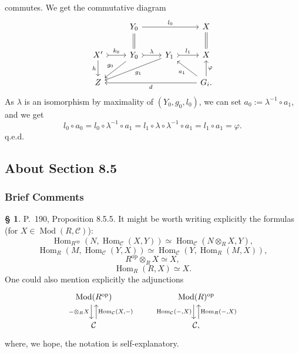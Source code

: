 \documentclass[12pt]{article}
\theoremstyle{remark}
\theoremstyle{definition}
\newtheorem{s}[thm]{\S}
\newcommand{\C}{\mathcal C}
\newcommand{\pp}{\varphi}
\DeclareMathOperator{\Hom}{Hom}
\DeclareMathOperator{\Mod}{Mod}
\DeclareMathOperator{\op}{op}
\begin{document}
commutes. We get the commutative diagram
$$
\begin{tikzcd}
{}&Y_0\ar[equal]{d}\ar{rr}{l_0}&&X\ar[equal]{d}\\ 
X'\ar{d}[swap]{h}\ar[tail]{r}{k_0}&Y_0\ar{dl}[swap]{g_0}\ar[tail]{r}{\lambda}&Y_1\ar{dll}{g_1}\ar[tail]{r}{l_1}&X\\ 
Z&&&G_i.\ar{u}[swap]{\pp}\ar{lll}{d}\ar{ul}{a_1}
\end{tikzcd}
$$ 
As $\lambda$ is an isomorphism by maximality of $(Y_0,g_0,l_0)$, we can set $a_0:=\lambda^{-1}\circ a_1$, and we get 
$$
l_0\circ a_0=l_0\circ\lambda^{-1}\circ a_1=l_1\circ\lambda\circ\lambda^{-1}\circ a_1=l_1\circ a_1=\pp.
$$ 
q.e.d.
 


\subsection{About Section 8.5}

\subsubsection{Brief Comments}

\begin{s} P.~190, Proposition 8.5.5. It might be worth writing explicitly the formulas (for $X\in\Mod(R,\C)$):
$$
\Hom_{R^{\op}}(N,\Hom_\C(X,Y))\simeq
\Hom_\C\left(N\otimes_RX,Y\right),
$$
$$
\Hom_R(M,\Hom_\C(Y,X))\simeq
\Hom_\C\left(Y,\Hom_R(M,X)\right),
$$
$$
R^{\op}\otimes_RX\simeq X,
$$
$$
\Hom_R(R,X)\simeq X.
$$
One could also mention explicitly the adjunctions
$$
\begin{tikzcd}
\Mod(R^{\op})\ar[xshift=-0.7ex]{d}[swap]{-\otimes_RX}&&&
\Mod(R)^{\op}\ar[xshift=-0.7ex]{d}[swap]{\Hom_\C(-,X)}\\
\C\ar[xshift=0.7ex]{u}[swap]{\Hom_\C(X,-)}&&&\C,\ar[xshift=0.7ex]{u}[swap]{\Hom_R(-,X)}
\end{tikzcd}
$$
where, we hope, the notation is self-explanatory.
\end{s}

%
\end{document}
